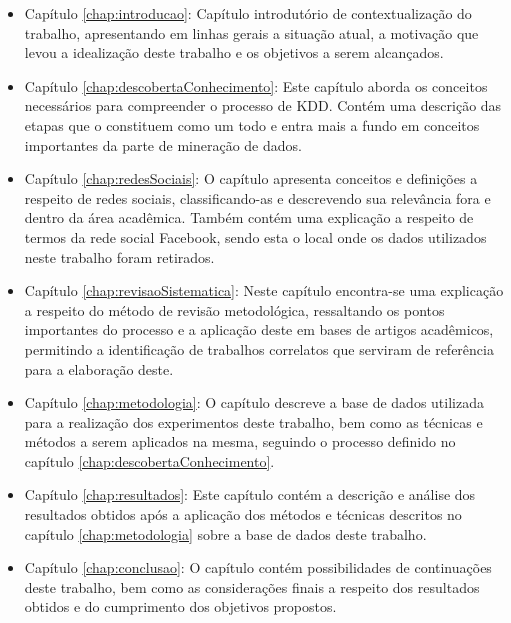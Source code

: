 \begin{itemize}
	\item Capítulo \ref{chap:introducao}: Capítulo introdutório de contextualização do trabalho, apresentando em linhas gerais a situação atual, a motivação que levou a idealização deste trabalho e os objetivos a serem alcançados.

	\item Capítulo \ref{chap:descobertaConhecimento}: Este capítulo aborda os conceitos necessários para compreender o processo de KDD. Contém uma descrição das etapas que o constituem como um todo e entra mais a fundo em conceitos importantes da parte de mineração de dados.

	\item Capítulo \ref{chap:redesSociais}: O capítulo apresenta conceitos e definições a respeito de redes sociais, classificando-as e descrevendo sua relevância fora e dentro da área acadêmica. Também contém uma explicação a respeito de termos da rede social Facebook, sendo esta o local onde os dados utilizados neste trabalho foram retirados.

	\item Capítulo \ref{chap:revisaoSistematica}: Neste capítulo encontra-se uma explicação a respeito do método de revisão metodológica, ressaltando os pontos importantes do processo e a aplicação deste em bases de artigos acadêmicos, permitindo a identificação de trabalhos correlatos que serviram de referência para a elaboração deste.

	\item Capítulo \ref{chap:metodologia}: O capítulo descreve a base de dados utilizada para a realização dos experimentos deste trabalho, bem como as técnicas e métodos a serem aplicados na mesma, seguindo o processo definido no capítulo \ref{chap:descobertaConhecimento}.

	\item Capítulo \ref{chap:resultados}: Este capítulo contém a descrição e análise dos resultados obtidos após a aplicação dos métodos e técnicas descritos no capítulo \ref{chap:metodologia} sobre a base de dados deste trabalho.

	\item Capítulo \ref{chap:conclusao}: O capítulo contém possibilidades de continuações deste trabalho, bem como as considerações finais a respeito dos resultados obtidos e do cumprimento dos objetivos propostos.
\end{itemize}